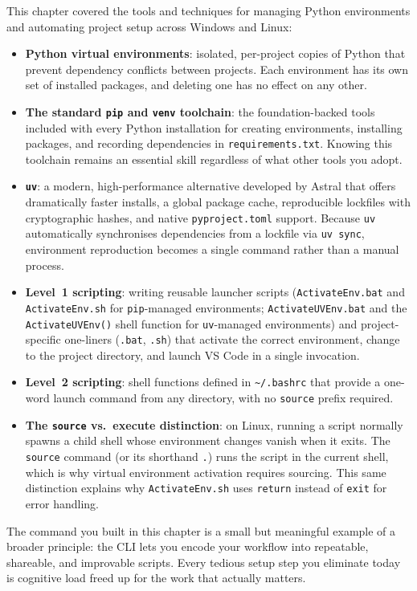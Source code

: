 This chapter covered the tools and techniques for managing Python
environments and automating project setup across Windows and Linux:

\begin{itemize}
  \item \textbf{Python virtual environments}: isolated, per-project
        copies of Python that prevent dependency conflicts between
        projects. Each environment has its own set of installed packages,
        and deleting one has no effect on any other.
  \item \textbf{The standard \texttt{pip} and \texttt{venv} toolchain}:
        the foundation-backed tools included with every Python
        installation for creating environments, installing packages, and
        recording dependencies in \texttt{requirements.txt}. Knowing
        this toolchain remains an essential skill regardless of what
        other tools you adopt.
  \item \textbf{\texttt{uv}}: a modern, high-performance alternative
        developed by Astral that offers dramatically faster installs, a
        global package cache, reproducible lockfiles with cryptographic
        hashes, and native \texttt{pyproject.toml} support. Because
        \texttt{uv} automatically synchronises dependencies from a
        lockfile via \texttt{uv sync}, environment reproduction becomes
        a single command rather than a manual process.
  \item \textbf{Level~1 scripting}: writing reusable launcher scripts
        (\texttt{ActivateEnv.bat} and \texttt{ActivateEnv.sh} for
        \texttt{pip}-managed environments; \texttt{ActivateUVEnv.bat}
        and the \texttt{ActivateUVEnv()} shell function for
        \texttt{uv}-managed environments) and project-specific
        one-liners (\texttt{\ProjectName{}.bat}, \texttt{\ProjectName{}.sh}) that
        activate the correct environment, change to the project
        directory, and launch VS Code in a single invocation.
  \item \textbf{Level~2 scripting}: shell functions defined in
        \texttt{\textasciitilde/.bashrc} that provide a one-word launch
        command from any directory, with no \texttt{source} prefix
        required.
  \item \textbf{The \texttt{source} vs.\ execute distinction}: on
        Linux, running a script normally spawns a child shell whose
        environment changes vanish when it exits. The \texttt{source}
        command (or its shorthand \texttt{.}) runs the script in the
        current shell, which is why virtual environment activation
        requires sourcing. This same distinction explains why
        \texttt{ActivateEnv.sh} uses \texttt{return} instead of
        \texttt{exit} for error handling.
\end{itemize}

The \texttt{\ProjectName{}} command you built in this chapter is a small but
meaningful example of a broader principle: the CLI lets you encode your
workflow into repeatable, shareable, and improvable scripts. Every
tedious setup step you eliminate today is cognitive load freed up for the
work that actually matters.
